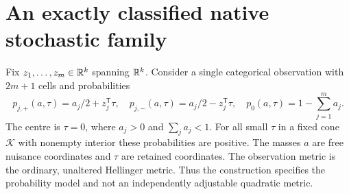 \section{An exactly classified native stochastic family}\label{sec:native}
Fix $z_1,\ldots,z_m\in\mathbb R^k$ spanning $\mathbb R^k$. Consider a single categorical observation with $2m+1$ cells and probabilities
\begin{equation}\label{eq:paired}
 p_{j,+}(a,\tau)=a_j/2+z_j^{\mathsf T}\tau,\quad
 p_{j,-}(a,\tau)=a_j/2-z_j^{\mathsf T}\tau,\quad
 p_0(a,\tau)=1-\sum_{j=1}^m a_j.
\end{equation}
The centre is $\tau=0$, where $a_j>0$ and $\sum_j a_j<1$. For all small $\tau$ in a fixed cone $\mathcal K$ with nonempty interior these probabilities are positive. The masses $a$ are free nuisance coordinates and $\tau$ are retained coordinates. The observation metric is the ordinary, unaltered Hellinger metric. Thus the construction specifies the probability model and not an independently adjustable quadratic metric.

